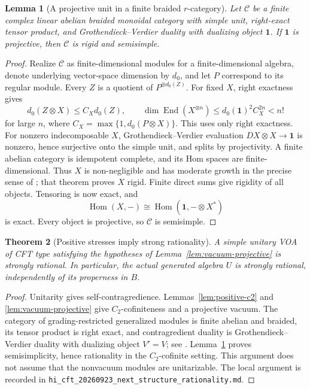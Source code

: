 \documentclass[11pt,a4paper]{article}
\newtheorem{theorem}{Theorem}[section]
\newtheorem{lemma}[theorem]{Lemma}
\theoremstyle{definition}
\newcommand{\artifact}[1]{\textnormal{\nolinkurl{#1}}}
\begin{document}
\begin{lemma}[A projective unit in a finite braided $r$-category]
\label{lem:projective-unit}
Let $\mathcal C$ be a finite complex linear abelian braided monoidal
category with simple unit, right-exact tensor product, and
Grothendieck--Verdier duality with dualizing object $\mathbf1$.
If $\mathbf1$ is projective, then $\mathcal C$ is rigid and semisimple.
\end{lemma}
\begin{proof}
Realize $\mathcal C$ as
finite-dimensional modules for a finite-dimensional algebra, denote
underlying vector-space dimension by $d_0$, and let $P$ correspond to
its regular module. Every $Z$ is a quotient of $P^{\oplus d_0(Z)}$.
For fixed $X$, right exactness gives
\[
 d_0(Z\otimes X)\le C_Xd_0(Z),\qquad
 \dim\operatorname{End}(X^{\otimes n})
 \le d_0(\mathbf1)^2C_X^{2n}<n!
\]
for large $n$, where $C_X=\max\{1,d_0(P\otimes X)\}$.
This uses only right exactness. For nonzero indecomposable $X$,
Grothendieck--Verdier evaluation
$DX\otimes X\to\mathbf1$ is nonzero, hence surjective onto the simple
unit, and splits by projectivity. A finite abelian category is
idempotent complete, and its Hom spaces are finite-dimensional.
Thus $X$ is non-negligible and has moderate growth in the precise
sense of \cite[Theorem~1.1]{EP}; that theorem proves $X$ rigid.
Finite direct sums give
rigidity of all objects. Tensoring is now exact, and
\[
 \operatorname{Hom}(X,-)
 \cong\operatorname{Hom}(\mathbf1,-\otimes X^*)
\]
is exact. Every object is projective, so $\mathcal C$ is semisimple.
\end{proof}

\begin{theorem}[Positive stresses imply strong rationality]
\label{thm:positive-stress-rationality}
A simple unitary VOA of CFT type satisfying the hypotheses of
Lemma~\ref{lem:vacuum-projective} is strongly rational. In particular,
the actual generated algebra $U$ is strongly rational, independently
of its properness in $B$.
\end{theorem}
\begin{proof}
Unitarity gives self-contragredience. Lemmas~\ref{lem:positive-c2} and
\ref{lem:vacuum-projective} give $C_2$-cofiniteness and a projective
vacuum. The category of grading-restricted generalized modules is
finite abelian and braided, its tensor product is right exact, and
contragredient duality is Grothendieck--Verdier duality with dualizing
object $V'=V$; see \cite[Sections~2.3 and~3]{McRae}.
Lemma~\ref{lem:projective-unit} proves semisimplicity, hence rationality
in the $C_2$-cofinite setting. This argument does not assume that the
nonvacuum modules are unitarizable.
The local argument is recorded in
\artifact{hi_cft_20260923_next_structure_rationality.md}.
\end{proof}
\end{document}
